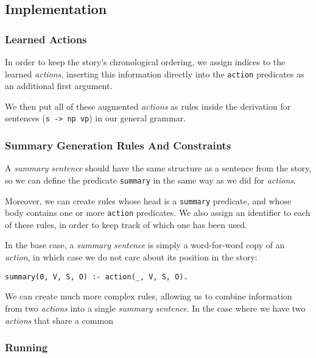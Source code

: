 \subsection{Implementation}

\subsubsection{Learned Actions}

In order to keep the story's chronological ordering, we assign indices to the learned \textit{actions}, inserting this information directly into the \texttt{action} predicates as an additional first argument.

We then put all of these augmented \textit{actions} as rules inside the derivation for sentences (\texttt{s -> np vp}) in our general grammar. 

\subsubsection{Summary Generation Rules And Constraints}

A \textit{summary sentence} should have the same structure as a sentence from the story, so we can define the predicate \texttt{summary} in the same way as we did for \textit{actions}.

Moreover, we can create rules whose head is a \texttt{summary} predicate, and whose body contains one or more \texttt{action} predicates. We also assign an identifier to each of these rules, in order to keep track of which one has been used.

In the base case, a \textit{summary sentence} is simply a word-for-word copy of an \textit{action}, in which case we do not care about its position in the story:

\begin{displayquote}
\begin{lstlisting}[numbers=none]
summary(0, V, S, O) :- action(_, V, S, O).
\end{lstlisting}
\end{displayquote} 

We can create much more complex rules, allowing us to combine information from two \textit{actions} into a single \textit{summary sentence}. In the case where we have two \textit{actions} that share a common 

\subsubsection{Running}


